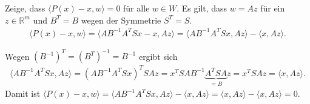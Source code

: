 \documentclass[9pt]{extarticle}
\theoremstyle{named}
\begin{document}
Zeige, dass $\langle P(x)-x, w \rangle = 0$ für alle $w \in W$. Es gilt, dass $w = Az$ für ein $z \in \mathbb R^m$ und $B^T = B$ wegen der Symmetrie $S^T = S$.
\begin{align*}
	\langle P(x)-x,w \rangle = \langle AB^{-1}A^TSx-x, Az \rangle = \langle AB^{-1}A^TSx, Az \rangle - \langle x,Az \rangle. 
\end{align*}

Wegen ${(B^{-1})}^T = {(B^T)}^{-1} = B^{-1}$ ergibt sich
\begin{align*}
	 \langle AB^{-1}A^TSx, Az \rangle = (AB^{-1}A^TSx)^TSAz = x^TSAB^{-1}\underbrace{A^TSA}_{=B}z = x^TSAz = \langle x, Az \rangle. 
\end{align*}
Damit ist $	\langle P(x)-x,w \rangle =  \langle AB^{-1}A^TSx, Az \rangle - \langle x,Az \rangle =  \langle x,Az \rangle -  \langle x,Az \rangle= 0$.
\end{document}
